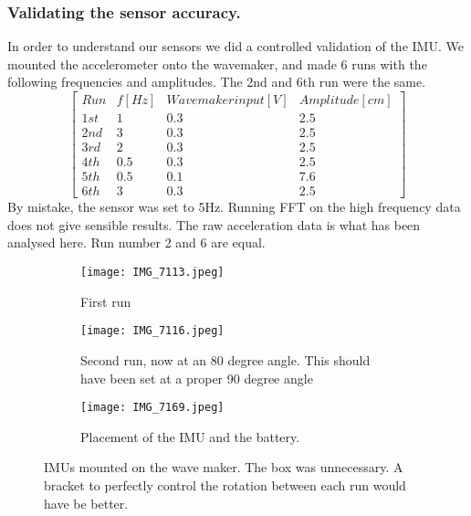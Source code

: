 \subsubsection{Validating the sensor accuracy.}
In order to understand our sensors we did a controlled validation of the IMU. We mounted the accelerometer onto the wavemaker, and made 6 runs with the following frequencies and amplitudes. The 2nd and 6th run were the same.
\[
\begin{bmatrix}
Run & f [Hz] & Wave maker input [V] & Amplitude [cm] \\
1st   & 1 &0.3 & 2.5 \\
2nd & 3 & 0.3 & 2.5 \\
3rd & 2 & 0.3 & 2.5 \\
4th & 0.5 & 0.3 & 2.5\\
5th & 0.5 & 0.1 & 7.6\\
6th & 3 & 0.3 & 2.5 
\end{bmatrix}
\]
By mistake, the sensor was set to 5Hz. Running FFT on the high frequency data does not give sensible results. The raw acceleration data is what has been analysed here. Run number 2 and 6 are equal. 

\begin{figure*}[htbp]
    \centering
    \begin{subfigure}[b]{0.3\textwidth}
        \centering
        \texttt{[image: IMG\_7113.jpeg]}
        \caption{First run}
        \label{fig:subfig100v}
    \end{subfigure}
    \hfill
    \begin{subfigure}[b]{0.3\textwidth}
        \centering
        \texttt{[image: IMG\_7116.jpeg]}
        \caption{Second run, now at an 80 degree angle. This should have been set at a proper 90 degree angle}
        \label{fig:subfig101v}
    \end{subfigure}
    \hfill
    \begin{subfigure}[b]{0.3\textwidth}
        \centering
        \texttt{[image: IMG\_7169.jpeg]}
        \caption{Placement of the IMU and the battery.}
        \label{fig:subfig102v}
    \end{subfigure}
    \caption{IMUs mounted on the wave maker. The box was unnecessary. A bracket to perfectly control the rotation between each run would have be better.}
    \label{fig:three_subfigures}
\end{figure*}




